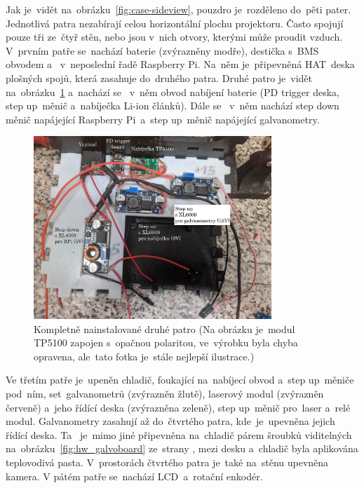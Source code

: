 Jak je~vidět na~obrázku~\ref{fig:case-sideview}, pouzdro je~rozděleno do~pěti pater. Jednotlivá patra nezabírají celou horizontální plochu projektoru. Často spojují pouze tři ze~čtyř stěn, nebo jsou  v~nich otvory, kterými může proudit vzduch.  V~prvním patře se~nachází baterie (zvýrazněny modře), destička  s~BMS obvodem a ~v~neposlední řadě Raspberry Pi.
Na~něm je~připevněná  HAT~deska plošných spojů, která zasahuje do~druhého patra. Druhé patro je~vidět na~obrázku~\ref{fig:hw_layer0} a~nachází se ~v~něm obvod nabíjení baterie (PD trigger deska, step up~měnič a~nabíječka Li-ion článků).
Dále se ~v~něm nachází step down měnič napájející Raspberry Pi~a~step up~měnič napájející galvanometry.
\begin{figure}[htb]
  \centering
  \includegraphics[width=0.8\textwidth]{img/hw_layer0.jpg}
  \caption{\label{fig:hw_layer0} Kompletně nainstalované druhé patro (Na obrázku je~modul TP5100 zapojen  s~opačnou polaritou, ve~výrobku byla chyba opravena,  ale~tato fotka je~stále nejlepší ilustrace.)}
\end{figure}

Ve třetím patře je~upeněn chladič, foukající na~nabíjecí obvod a~step up~měniče  pod~ním,  set~galvanometrů (zvýrazněn žlutě), laserový modul (zvýrazněn červeně) a~jeho řídící deska (zvýrazněna zeleně), step up~měnič  pro~laser a~relé modul.  
Galvanometry zasahují až do~čtvrtého patra,  kde~je~upevněna jejich řídící deska. Ta ~je~mimo jiné připevněna na~chladič párem šroubků viditelných na~obrázku~\ref{fig:hw_galvoboard} ze~strany \pageref{fig:hw_galvoboard}, mezi desku  a~chladič byla aplikována teplovodivá pasta.  V~prostorách čtvrtého patra je~také na~stěnu upevněna kamera.
V pátém patře se~nachází  LCD~a~rotační enkodér.


